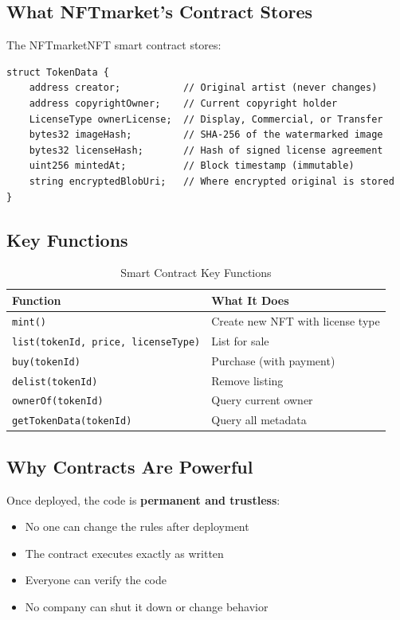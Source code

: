\documentclass[11pt,a4paper]{article}
\newcommand{\code}[1]{\texttt{#1}}
\begin{document}
\subsection{What NFTmarket's Contract Stores}

The NFTmarketNFT smart contract stores:

\begin{mdframed}[style=codeblock]
\begin{verbatim}
struct TokenData {
    address creator;           // Original artist (never changes)
    address copyrightOwner;    // Current copyright holder
    LicenseType ownerLicense;  // Display, Commercial, or Transfer
    bytes32 imageHash;         // SHA-256 of the watermarked image
    bytes32 licenseHash;       // Hash of signed license agreement
    uint256 mintedAt;          // Block timestamp (immutable)
    string encryptedBlobUri;   // Where encrypted original is stored
}
\end{verbatim}
\end{mdframed}

\subsection{Key Functions}

\begin{table}[h]
\centering
\begin{tabular}{@{}ll@{}}
\toprule
\textbf{Function} & \textbf{What It Does} \\
\midrule
\code{mint()} & Create new NFT with license type \\
\code{list(tokenId, price, licenseType)} & List for sale \\
\code{buy(tokenId)} & Purchase (with payment) \\
\code{delist(tokenId)} & Remove listing \\
\code{ownerOf(tokenId)} & Query current owner \\
\code{getTokenData(tokenId)} & Query all metadata \\
\bottomrule
\end{tabular}
\caption{Smart Contract Key Functions}
\end{table}

\subsection{Why Contracts Are Powerful}

Once deployed, the code is \textbf{permanent and trustless}:
\begin{itemize}
    \item No one can change the rules after deployment
    \item The contract executes exactly as written
    \item Everyone can verify the code
    \item No company can shut it down or change behavior
\end{itemize}
\end{document}
